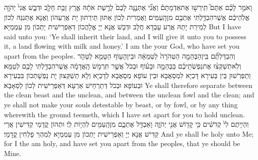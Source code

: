 {וָאֹמַ֣ר לָכֶ֗ם אַתֶּם֮ תִּֽירְשׁ֣וּ אֶת\maqqaf אַדְמָתָם֒ וַאֲנִ֞י אֶתְּנֶ֤נָּה לָכֶם֙ לָרֶ֣שֶׁת אֹתָ֔הּ אֶ֛רֶץ זָבַ֥ת חָלָ֖ב וּדְבָ֑שׁ אֲנִי֙ יְהֹוָ֣ה אֱלֹֽהֵיכֶ֔ם אֲשֶׁר\maqqaf הִבְדַּ֥לְתִּי אֶתְכֶ֖ם מִן\maqqaf הָֽעַמִּֽים׃}
{וַאֲמַרִית לְכוֹן אַתּוּן תֵּירְתוּן יָת אֲרַעְהוֹן וַאֲנָא אֶתְּנִנַּהּ לְכוֹן לְמֵירַת יָתַהּ אֲרַע עָבְדָא חֲלָב וּדְבָשׁ אֲנָא יְיָ אֱלָהֲכוֹן דְּאַפְרֵישִׁית יָתְכוֹן מִן עַמְמַיָּא׃}
{But I have said unto you: ‘Ye shall inherit their land, and I will give it unto you to possess it, a land flowing with milk and honey.’ I am the \lord\space your God, who have set you apart from the peoples.}{}
{וְהִבְדַּלְתֶּ֞ם בֵּֽין\maqqaf הַבְּהֵמָ֤ה הַטְּהֹרָה֙ לַטְּמֵאָ֔ה וּבֵין\maqqaf הָע֥וֹף הַטָּמֵ֖א לַטָּהֹ֑ר וְלֹֽא\maqqaf תְשַׁקְּצ֨וּ אֶת\maqqaf נַפְשֹֽׁתֵיכֶ֜ם בַּבְּהֵמָ֣ה וּבָע֗וֹף וּבְכֹל֙ אֲשֶׁ֣ר תִּרְמֹ֣שׂ הָֽאֲדָמָ֔ה אֲשֶׁר\maqqaf הִבְדַּ֥לְתִּי לָכֶ֖ם לְטַמֵּֽא׃}
{וְתַפְרְשׁוּן בֵּין בְּעִירָא דָּכְיָא לִמְסָאֲבָא וּבֵין עוֹפָא מְסָאֲבָא לְדָכְיָא וְלָא תְשַׁקְּצוּן יָת נַפְשָׁתְכוֹן בִּבְעִירָא וּבְעוֹפָא וּבְכֹל דְּתַרְחֵישׁ אַרְעָא דְּאַפְרֵישִׁית לְכוֹן לְסַאָבָא׃}
{Ye shall therefore separate between the clean beast and the unclean, and between the unclean fowl and the clean; and ye shall not make your souls detestable by beast, or by fowl, or by any thing wherewith the ground teemeth, which I have set apart for you to hold unclean.}{}
{וִהְיִ֤יתֶם לִי֙ קְדֹשִׁ֔ים כִּ֥י קָד֖וֹשׁ אֲנִ֣י יְהֹוָ֑ה וָאַבְדִּ֥ל אֶתְכֶ֛ם מִן\maqqaf הָֽעַמִּ֖ים לִהְי֥וֹת לִֽי׃}
{וּתְהוֹן קֳדָמַי קַדִּישִׁין אֲרֵי קַדִּישׁ אֲנָא יְיָ וְאַפְרֵישִׁית יָתְכוֹן מִן עַמְמַיָּא לְמִהְוֵי פָלְחִין קֳדָמָי׃}
{And ye shall be holy unto Me; for I the \lord\space am holy, and have set you apart from the peoples, that ye should be Mine.}{}
